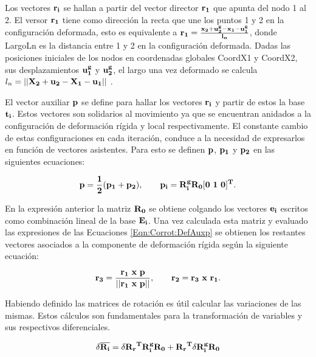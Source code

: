  Los vectores $\bf{r_i}$ se hallan a partir del vector director $\bf{r_1}$ que apunta del nodo 1 al 2.  El versor $\bf{r_1}$ tiene como dirección la recta que une los puntos 1 y 2 en la configuración deformada, esto es equivalente a $\bf{r_1}=\frac{\bf{x}_2+\bf{u}_2^g-\bf{x}_1-\bf{u}_1^g}{l_n}$, donde \gls{LargoLn} es la distancia entre 1 y 2 en la configuración deformada. Dadas las posiciones iniciales de los nodos en coordenadas globales \gls{CoordX1} y \gls{CoordX2}, sus desplazamientos $\bf{u}_1^g$ y $\bf{u}_2^g$, el largo una vez deformado se calcula $l_n=||\bf{X}_2+\bf{u}_2-\bf{X}_1-\bf{u}_1||$  .
 
El vector auxiliar $\bf{p}$ se define para hallar los vectores $\bf{r}_i$ y partir de estos la base $\bf{t}_i$. Estos vectores son solidarios al movimiento ya que se encuentran anidados a la configuración de deformación rígida y local respectivamente. El constante cambio de estas configuraciones en cada iteración, conduce a la necesidad de expresarlos en función de vectores asistentes. Para esto se definen
$\bf{p}$, $\bf{p_1}$ y $\bf{p_2}$ en las siguientes ecuaciones:

\begin{equation}\label{Eqn:Corrot:DefAuxp}
	\bf{p}=\frac{1}{2}(\bf{p}_1+\bf{p}_2),~~~~~~\bf{p_i}=\bf{R}_i^g\bf{R}_0[0~1~0]^T.
\end{equation}

En la expresión anterior la matriz $\bf{R}_0$ se obtiene colgando los vectores $\bf{e}_i$ escritos como combinación lineal de la base $\bf{E_i}$. Una vez calculada esta matriz y evaluado las expresiones de las Ecuaciones \eqref{Eqn:Corrot:DefAuxp} se obtienen los restantes vectores asociados a la componente de deformación rígida según la siguiente ecuación:


\begin{equation}\label{Eqn:Corrot:VectorsR}
	\bf{r}_3=\frac{\bf{r_1}~x~\bf{p}}{||\bf{r_1}~x~\bf{p}||},~~~~~~\bf{r_2}=\bf{r_3}~x~\bf{r_1}.
\end{equation}


Habiendo definido las matrices de rotación  es útil calcular las variaciones de las mismas. Estos cálculos son fundamentales para la transformación de variables y sus respectivos diferenciales.

\begin{equation}\label{eq:PRE:DifMatrix}
	\delta \overline{\bf{R_i}}=\delta\bf{R_r}^T\bf{R_i^g}\bf{R_0}+\bf{R_r}^T\delta \bf{R_i^g}\bf{R_0}
\end{equation}

